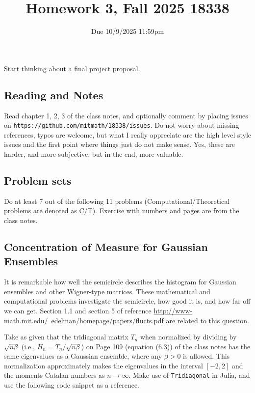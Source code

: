 \documentclass{article}
\title{Homework 3, Fall 2025 18338}
\author{Due 10/9/2025 11:59pm}
\date{}
\begin{document}
\maketitle



Start thinking about a final project proposal.

\subsection*{Reading and Notes}
Read chapter 1, 2, 3 of the class notes, and optionally comment  by placing  issues on \verb+https://github.com/mitmath/18338/issues+.
Do not worry about missing references, typos are welcome, but what I really appreciate are
the high level style issues and the first point where things just do  not make sense.
Yes, these are harder, and more subjective, but in the end, more valuable.


\subsection*{Problem sets}
Do at least 7 out of the following 11 problems (Computational/Theoretical problems are denoted as C/T). Exercise with numbers and pages are from the class notes.

\subsection*{Concentration of Measure for Gaussian Ensembles}

It is remarkable how well the semicircle describes the histogram for Gaussian ensembles and other Wigner-type matrices. These mathematical and computational problems investigate the semicircle, how good it is, and how far off we can get. Section 1.1 and section 5 of reference \href{http://www-math.mit.edu/~edelman/homepage/papers/flucts.pdf}{http://www-math.mit.edu/~edelman/homepage/papers/flucts.pdf} are related to this question.

Take as given that the tridiagonal matrix $T_n$ when normalized by dividing by $\sqrt{n \beta }$ (i.e., $H_n = T_n/\sqrt{n \beta }$) on Page 109 (equation (6.3)) of the class notes has the same eigenvalues as a Gaussian ensemble, where any $\beta>0$ is allowed. 
This normalization approximately makes the 
eigenvalues in the interval $[-2,2]$ and the moments  Catalan numbers as $n \rightarrow \infty$.
Make use of \verb|Tridiagonal| in Julia, and use the following code snippet as a reference.
\end{document}

